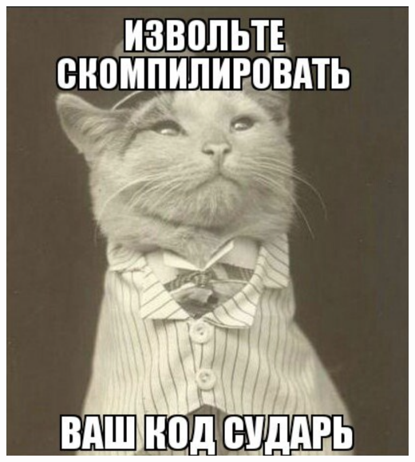 \documentclass[11pt,aspectratio=169,handout]{beamer}
\begin{document}
\begin{frame}{}

\begin{center}
\includegraphics[scale=0.4]{images/compile.png}
\end{center}

\end{frame}
\end{document}
